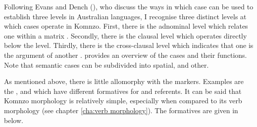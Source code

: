 Following Evans and Dench (\citeyear{Evans:1988ge}), who discuss the ways in which case can be used to establish three levels in Australian languages, I recognise three distinct levels at which cases operate in Komnzo. First, there is the adnominal level which relates one  within a matrix . Secondly, there is the clausal level which operates directly below the  level. Thirdly, there is the cross-clausal level which indicates that one  is the argument of another .  provides an overview of the cases and their functions. Note that semantic cases can be subdivided into spatial,  and other.

As mentioned above, there is little allomorphy with the  markers. Examples are the ,  and   which have different formatives for  and  referents. It can be said that Komnzo  morphology is relatively simple, especially when compared to its verb morphology (see chapter \ref{cha:verb morphology}). The formatives are given in  below. 

